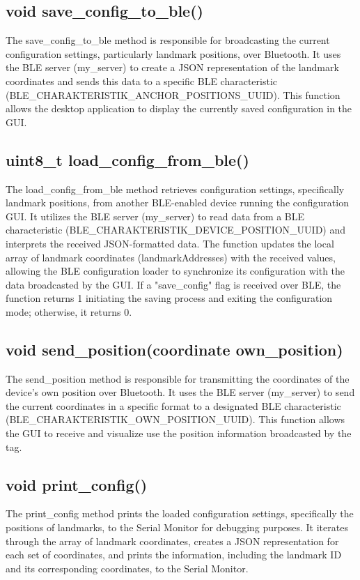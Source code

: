 \subsection{void save\_config\_to\_ble()}
\label{sub:save_config_to_ble}
The save\_config\_to\_ble method is responsible for broadcasting the current configuration settings, particularly landmark positions, over Bluetooth. 
It uses the BLE server (my\_server) to create a JSON representation of the landmark coordinates and sends this data to a specific BLE characteristic 
\newline 
(BLE\_CHARAKTERISTIK\_ANCHOR\_POSITIONS\_UUID). 
This function allows the desktop application to display the currently saved configuration in the GUI. 

\subsection{uint8\_t load\_config\_from\_ble()}
\label{sub:load_config_from_ble}
The load\_config\_from\_ble method retrieves configuration settings, specifically landmark positions, from another BLE-enabled device running the configuration GUI. 
It utilizes the BLE server (my\_server) to read data from a BLE characteristic
\newline 
(BLE\_CHARAKTERISTIK\_DEVICE\_POSITION\_UUID) and interprets the received JSON-formatted data. 
The function updates the local array of landmark coordinates (landmarkAddresses) with the received values, allowing the BLE configuration loader to synchronize its configuration with the data broadcasted by the GUI. 
If a "save\_config" flag is received over BLE, the function returns 1 initiating the saving process and exiting the configuration mode; otherwise, it returns 0.

\subsection{void send\_position(coordinate own\_position)}
\label{sub:send_position}
The send\_position method is responsible for transmitting the coordinates of the device's own position over Bluetooth. 
It uses the BLE server (my\_server) to send the current coordinates in a specific format to a designated BLE characteristic 
\newline 
(BLE\_CHARAKTERISTIK\_OWN\_POSITION\_UUID). 
This function allows the GUI to receive and visualize use the position information broadcasted by the tag.

\subsection{void print\_config()}
\label{sub:print_config}
The print\_config method prints the loaded configuration settings, specifically the positions of landmarks, to the Serial Monitor for debugging purposes. 
It iterates through the array of landmark coordinates, creates a JSON representation for each set of coordinates, and prints the information, including the landmark ID and its corresponding coordinates, to the Serial Monitor. 
